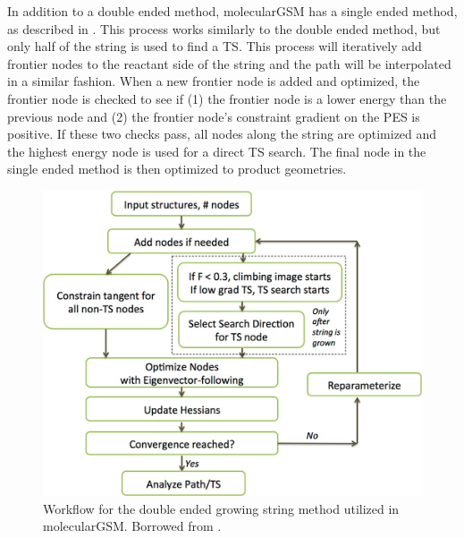 \documentclass[preprint, 11pt]{elsarticle} %
\begin{document}
In addition to a double ended method, molecularGSM has a single ended method, as described in .
This process works similarly to the double ended method, but only half of the string is used to find a TS.
This process will iteratively add frontier nodes to the reactant side of the string and the path will be interpolated in a similar fashion.
When a new frontier node is added and optimized, the frontier node is checked to see if (1) the frontier node is a lower energy than the previous node and (2) the frontier node's constraint gradient on the PES is positive. 
If these two checks pass, all nodes along the string are optimized and the highest energy node is used for a direct TS search.
The final node in the single ended method is then optimized to product geometries.


\begin{figure}[htbp]
    \centering
    \includegraphics[width=5in]{gsm}
    \caption{Workflow for the double ended growing string method utilized in molecularGSM. Borrowed from \cite{Zimmerman:2013jctc}.}
    \label{fig:gsm}
\end{figure}
\end{document}
